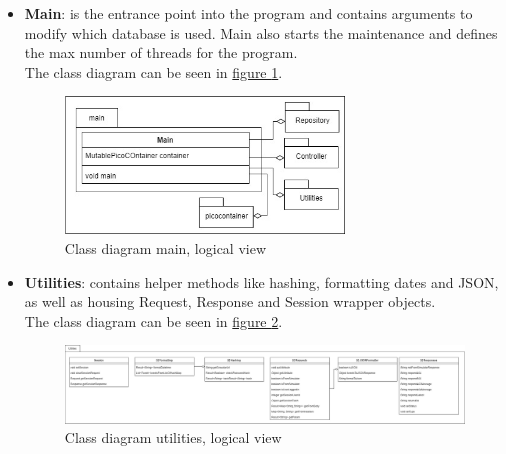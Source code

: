 \begin{itemize}
    \item \textbf{Main}: is the entrance point into the program and contains arguments to modify which database is used. Main also starts the maintenance and defines the max number of threads for the program.\\
    The class diagram can be seen in \hyperref[fig:classDiagramMain]{figure \ref{fig:classDiagramMain}}.
    \begin{figure}[H]
        \centering
        \includegraphics[width=0.7\textwidth]{images/class_diagram_main.jpg}
        \caption{Class diagram main, logical view}
        \label{fig:classDiagramMain}
    \end{figure}
    
    \item \textbf{Utilities}: contains helper methods like hashing, formatting dates and JSON, as well as housing Request, Response and Session wrapper objects. \\
    The class diagram can be seen in \hyperref[fig:classDiagramUtilities]{figure \ref{fig:classDiagramUtilities}}.
    \begin{figure}[H]
        \centering
        \includegraphics[width=1.0\textwidth]{images/class_diagram_utilities.jpg}
        \caption{Class diagram utilities, logical view}
        \label{fig:classDiagramUtilities}
    \end{figure}
    

\end{itemize}
